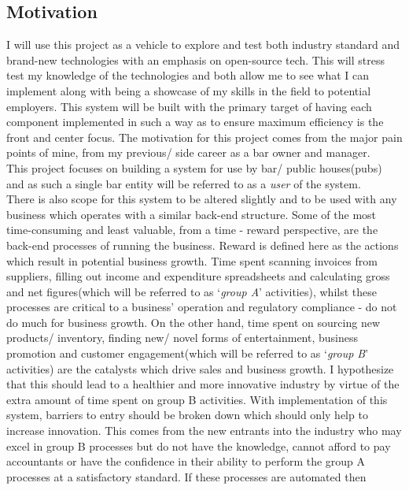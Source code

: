 \begin{flushleft}
	\subsection{Motivation}
	I will use this project as a vehicle to explore and test both industry standard and brand-new technologies with an emphasis on open-source tech. This will stress test my knowledge of the
	technologies and both allow me to see what I can implement along with being a showcase of my skills in the field to potential employers.
	This system will be built with the primary target of having each component implemented in such a way as to ensure maximum efficiency is the front and center focus.
	\bigbreak
	The motivation for this project comes from the major pain points of mine, from my previous/ side career as a bar owner and manager. \\ This project focuses on building a system for use by
	bar/ public houses(pubs) and as such a single bar entity will be referred to as a \emph{user} of the system.\\
	There is also scope for this system to be altered slightly and to be used with any business which operates with a similar back-end structure.
	\bigbreak
	Some of the most time-consuming and least valuable, from a time - reward perspective, are the back-end processes of running the business. Reward is defined here as the actions which result
	in potential business growth. Time spent scanning invoices from suppliers, filling out income and expenditure spreadsheets and calculating gross and net figures(which will be referred to
	as `\emph{group A}’ activities), whilst these processes are critical to a business’ operation and regulatory compliance - do not do much for business growth.
	On the other hand, time spent on sourcing new products/ inventory, finding new/ novel forms of entertainment, business promotion and customer engagement(which will be referred to as
	`\emph{group B}’ activities) are the catalysts which drive sales and business growth.
	\bigbreak
	I hypothesize that this should lead to a healthier and more innovative industry by virtue of the extra amount of time spent on group B activities. With implementation of this system,
	barriers to entry should be broken down which should only help to increase innovation. This comes from the new entrants into the industry who may excel in group B processes but do not have
	the knowledge, cannot afford to pay accountants or have the confidence in their ability to perform the group A processes at a satisfactory standard. If these processes are automated then

\end{flushleft}

